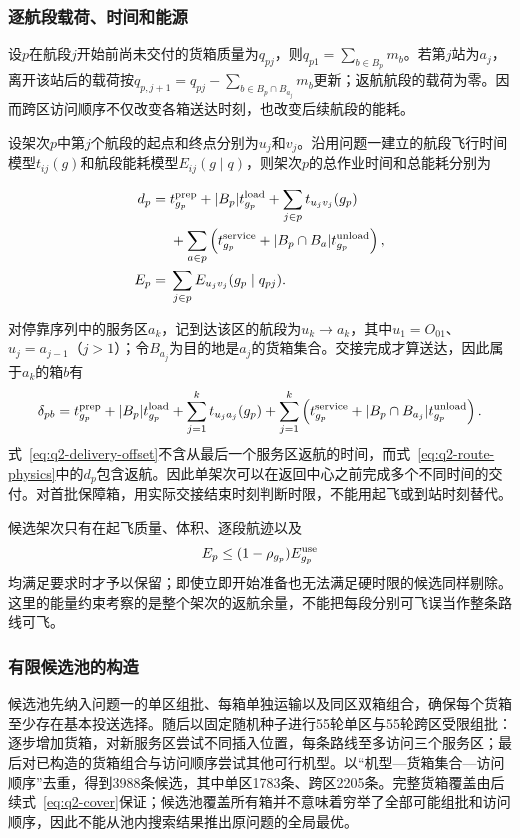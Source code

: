 \subsubsection{逐航段载荷、时间和能源}

设$p$在航段$j$开始前尚未交付的货箱质量为$q_{pj}$，则$q_{p1}=\sum_{b\in B_p}m_b$。若第$j$站为$a_j$，离开该站后的载荷按$q_{p,j+1}=q_{pj}-\sum_{b\in B_p\cap B_{a_j}}m_b$更新；返航航段的载荷为零。因而跨区访问顺序不仅改变各箱送达时刻，也改变后续航段的能耗。

设架次$p$中第$j$个航段的起点和终点分别为$u_j$和$v_j$。沿用问题一建立的航段飞行时间模型$t_{ij}(g)$和航段能耗模型$E_{ij}(g\mid q)$，则架次$p$的总作业时间和总能耗分别为

\begin{equation}
\begin{aligned}
d_p={}&t^{\rm prep}_{g_p}+|B_p|t^{\rm load}_{g_p}
+\sum_{j\in p}t_{u_jv_j}(g_p)\\
&+\sum_{a\in p}
\left(
t^{\rm service}_{g_p}
+|B_p\cap B_a|t^{\rm unload}_{g_p}
\right),
\\
E_p={}&\sum_{j\in p}E_{u_jv_j}(g_p\mid q_{pj}).
\end{aligned}
\label{eq:q2-route-physics}
\end{equation}

对停靠序列中的服务区$a_k$，记到达该区的航段为$u_k\to a_k$，其中$u_1=O_{01}$、$u_j=a_{j-1}$（$j>1$）；令$B_{a_j}$为目的地是$a_j$的货箱集合。交接完成才算送达，因此属于$a_k$的箱$b$有
\begin{equation}
\delta_{pb}=t^{\rm prep}_{g_p}+|B_p|t^{\rm load}_{g_p}
+\sum_{j=1}^{k}t_{u_j a_j}(g_p)
+\sum_{j=1}^{k}\left(t^{\rm service}_{g_p}
+|B_p\cap B_{a_j}|t^{\rm unload}_{g_p}\right).
\label{eq:q2-delivery-offset}
\end{equation}
式~\eqref{eq:q2-delivery-offset}不含从最后一个服务区返航的时间，而式~\eqref{eq:q2-route-physics}中的$d_p$包含返航。因此单架次可以在返回中心之前完成多个不同时间的交付。对首批保障箱，用实际交接结束时刻判断时限，不能用起飞或到站时刻替代。

候选架次只有在起飞质量、体积、逐段航迹以及
\[
E_p\le(1-\rho_{g_p})E_{g_p}^{\rm use}
\]
均满足要求时才予以保留；即使立即开始准备也无法满足硬时限的候选同样剔除。这里的能量约束考察的是整个架次的返航余量，不能把每段分别可飞误当作整条路线可飞。

\subsubsection{有限候选池的构造}
候选池先纳入问题一的单区组批、每箱单独运输以及同区双箱组合，确保每个货箱至少存在基本投送选择。随后以固定随机种子进行55轮单区与55轮跨区受限组批：逐步增加货箱，对新服务区尝试不同插入位置，每条路线至多访问三个服务区；最后对已构造的货箱组合与访问顺序尝试其他可行机型。以“机型—货箱集合—访问顺序”去重，得到3988条候选，其中单区1783条、跨区2205条。完整货箱覆盖由后续式~\eqref{eq:q2-cover}保证；候选池覆盖所有箱并不意味着穷举了全部可能组批和访问顺序，因此不能从池内搜索结果推出原问题的全局最优。

